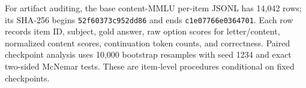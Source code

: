 For artifact auditing, the base content-MMLU per-item JSONL has 14,042 rows;
its SHA-256 begins \texttt{52f60373c952dd86} and ends
\texttt{c1e07766e0364701}. Each row records
item ID, subject, gold answer, raw option scores for letter/content, normalized
content scores, continuation token counts, and correctness. Paired checkpoint
analysis uses 10,000 bootstrap resamples with seed 1234 and exact two-sided
McNemar tests. These are item-level procedures conditional on fixed checkpoints.



